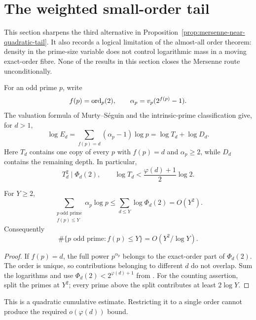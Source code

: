 \section{The weighted small-order tail}
\label{sec:mersenne-weighted-order-tail}

This section sharpens the third alternative in
Proposition~\ref{prop:mersenne-near-quadratic-tail}.  It also records a
logical limitation of the almost-all order theorem: density in the
prime-size variable does not control logarithmic mass in a moving
exact-order fibre.  None of the results in this section closes the
Mersenne route unconditionally.

For an odd prime $p$, write
\[
 f(p)=\operatorname{ord}_p(2),\qquad
 \alpha_p=v_p(2^{f(p)}-1).
\]
The valuation formula of Murty--S\'eguin and the intrinsic-prime
classification give, for $d>1$,
\begin{equation}\label{eq:weighted-tail-exact-ledger}
 \log E_d
 =\sum_{f(p)=d}(\alpha_p-1)\log p
 =\log T_d+\log D_d.
\end{equation}
Here $T_d$ contains one copy of every $p$ with $f(p)=d$ and
$\alpha_p\ge2$, while $D_d$ contains the remaining depth.  In particular,
\begin{equation}\label{eq:weighted-tail-square-budget}
 T_d^2\mid\Phi_d(2),\qquad
 \log T_d<\frac{\varphi(d)+1}{2}\log2.
\end{equation}

\begin{proposition}
\label{prop:global-order-index-budget}
For $Y\ge2$,
\[
 \sum_{\substack{p\ \text{odd prime}\\f(p)\le Y}}
       \alpha_p\log p
 \le \sum_{d\le Y}\log\Phi_d(2)=O(Y^2).
\]
Consequently
\[
 \#\{p\text{ odd prime}:f(p)\le Y\}=O(Y^2/\log Y).
\]
\end{proposition}

\begin{proof}
If $f(p)=d$, the full power $p^{\alpha_p}$ belongs to the exact-order
part of $\Phi_d(2)$.  The order is unique, so contributions belonging to
different $d$ do not overlap.  Sum the logarithms and use
$\Phi_d(2)<2^{\varphi(d)+1}$ from
\cite{PomeranceCyclotomic2025}.  For the counting assertion, split the
primes at $Y^2$; every prime above the split contributes at least
$2\log Y$.
\end{proof}

This is a quadratic cumulative estimate.  Restricting it to a single
order cannot produce the required $o(\varphi(d))$ bound.

